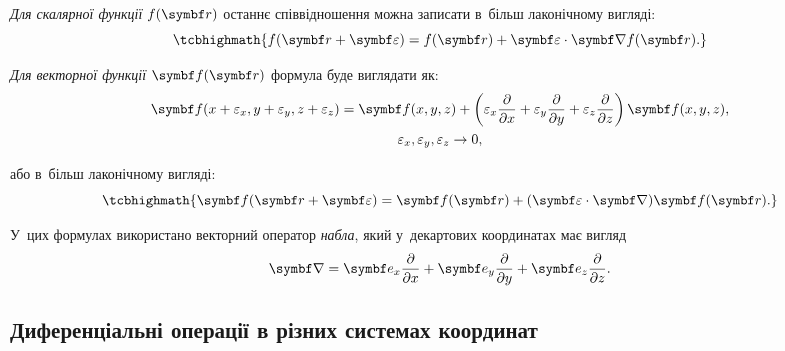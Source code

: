 \emph{Для скалярної функції} $f(\vect{r})$ останнє співвідношення можна записати в~більш
лаконічному вигляді:
\begin{equation}\label{eq:sc_diff}
	\tcbhighmath{
		f(\vect{r} + \vect{\epsilon}) = f(\vect{r}) +
		\vect{\epsilon}\cdot\vect{\nabla}f(\vect{r}).
	}
\end{equation}

\emph{Для векторної функції} $\vect{f}(\vect{r})$ формула буде виглядати як:
\begin{multline*}
	\vect{f}(x + \epsilon_x, y + \epsilon_y, z + \epsilon_z) =
	\vect{f}(x, y, z) +\left(
	\epsilon_x \frac{\partial}{\partial x}  +
	\epsilon_y \frac{\partial}{\partial y}  +
	\epsilon_z\frac{\partial}{\partial z}\right) \vect{f}(x,y,z), \\ \epsilon_x, \epsilon_y,
	\epsilon_z  \to 0,
\end{multline*}

або в~більш лаконічному вигляді:
\begin{equation}\label{eq:vec_diff}
	\tcbhighmath{
		\vect{f}(\vect{r} + \vect{\epsilon}) = \vect{f}(\vect{r}) +
		(\vect{\epsilon}\cdot\vect{\nabla})\vect{f}(\vect{r}).
	}
\end{equation}

У~цих формулах використано векторний оператор \emph{набла}, який у~декартових координатах
має вигляд
	\begin{equation*}
		\vect{\nabla} = \vect{e}_x \frac{\partial}{\partial x} +
		\vect{e}_y \frac{\partial}{\partial y} + \vect{e}_z
		\frac{\partial}{\partial z}.
	\end{equation*}

\subsection{Диференціальні операції в різних системах координат}\hypertarget{vector-diff-operations-coordinates}{}

